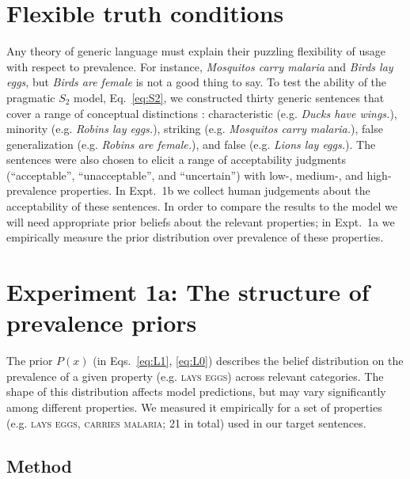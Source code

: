 \documentclass[12pt,letterpaper]{article}
\begin{document}

\section*{Flexible truth conditions}

Any theory of generic language must explain their puzzling flexibility of usage with respect to prevalence.
For instance, \emph{Mosquitos carry malaria} and \emph{Birds lay eggs}, but \emph{Birds are female} is not a good thing to say.
To test the ability of the pragmatic $S_2$ model, Eq.~\ref{eq:S2}, we constructed thirty generic sentences 
that cover a range of conceptual distinctions  \cite{Prasada2013}: characteristic (e.g. \emph{Ducks have wings.}), minority (e.g. \emph{Robins lay eggs.}), striking (e.g. \emph{Mosquitos carry malaria.}), false generalization (e.g. \emph{Robins are female.}), and false (e.g. \emph{Lions lay eggs.}).
The sentences were also chosen to elicit a range of acceptability judgments (``acceptable'', ``unacceptable'', and ``uncertain'') with low-, medium-, and high-prevalence properties.
In Expt.~1b we collect human judgements about the acceptability of these sentences. 
In order to compare the results to the model we will need appropriate prior beliefs about the relevant properties; 
in Expt.~1a we empirically measure the prior distribution over prevalence of these properties.

\section*{Experiment 1a: The structure of prevalence priors}

 The prior $P(x)$ (in Eqs.~\ref{eq:L1}, \ref{eq:L0}) describes the belief distribution on the prevalence of a given property (e.g. \textsc{lays eggs}) across relevant categories. 
The shape of this distribution affects model predictions, but may vary significantly among different properties.
 We measured it empirically for a set of properties (e.g. \textsc{lays eggs, carries malaria}; 21 in total) used in our target sentences. 
 
\subsection*{Method}
\end{document}
